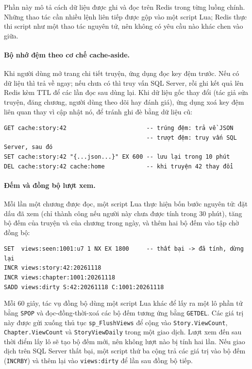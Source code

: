 Phần này mô tả cách dữ liệu được ghi và đọc trên Redis trong từng luồng chính. Những thao tác cần nhiều lệnh liên tiếp được gộp vào một script Lua; Redis thực thi script như một thao tác nguyên tử, nên không có yêu cầu nào khác chen vào giữa.

\paragraph{Bộ nhớ đệm theo cơ chế cache-aside.} Khi người dùng mở trang chi tiết truyện, ứng dụng đọc key đệm trước. Nếu có dữ liệu thì trả về ngay; nếu chưa có thì truy vấn SQL Server, rồi ghi kết quả lên Redis kèm TTL để các lần đọc sau dùng lại. Khi dữ liệu gốc thay đổi (tác giả sửa truyện, đăng chương, người dùng theo dõi hay đánh giá), ứng dụng xoá key đệm liên quan thay vì cập nhật nó, để tránh ghi đè bằng dữ liệu cũ:

\begin{verbatim}
GET cache:story:42                       -- trúng đệm: trả về JSON
                                         -- trượt đệm: truy vấn SQL Server, sau đó
SET cache:story:42 "{...json...}" EX 600 -- lưu lại trong 10 phút
DEL cache:story:42 cache:home            -- khi truyện 42 thay đổi
\end{verbatim}

\paragraph{Đếm và đồng bộ lượt xem.} Mỗi lần một chương được đọc, một script Lua thực hiện bốn bước nguyên tử: đặt dấu đã xem (chỉ thành công nếu người này chưa được tính trong 30 phút), tăng bộ đếm của truyện và của chương trong ngày, và thêm hai bộ đếm vào tập chờ đồng bộ:

\begin{verbatim}
SET  views:seen:1001:u7 1 NX EX 1800     -- thất bại -> đã tính, dừng lại
INCR views:story:42:20261118
INCR views:chapter:1001:20261118
SADD views:dirty S:42:20261118 C:1001:20261118
\end{verbatim}

Mỗi 60 giây, tác vụ đồng bộ dùng một script Lua khác để lấy ra một lô phần tử bằng \texttt{SPOP} và đọc-đồng-thời-xoá các bộ đếm tương ứng bằng \texttt{GETDEL}. Các giá trị này được gửi xuống thủ tục \texttt{sp\_FlushViews} để cộng vào \texttt{Story.ViewCount}, \texttt{Chapter.ViewCount} và \texttt{StoryViewDaily} trong một giao dịch. Lượt xem đến sau thời điểm lấy lô sẽ tạo bộ đếm mới, nên không lượt nào bị tính hai lần. Nếu giao dịch trên SQL Server thất bại, một script thứ ba cộng trả các giá trị vào bộ đếm (\texttt{INCRBY}) và thêm lại vào \texttt{views:dirty} để lần sau đồng bộ tiếp.

